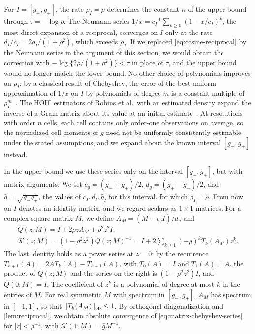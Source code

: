 For $I=[g_-,g_+]$, the rate $\rho_I=\rho$ determines the constant
$\kappa$ of the upper bound through $\tau=-\log\rho$. The Neumann series
$1/x=c_I^{-1}\sum_{k\ge0}(1-x/c_I)^k$, the most direct expansion of a
reciprocal, converges on $I$ only at the rate
$d_I/c_I=2\rho_I/(1+\rho_I^2)$, which exceeds $\rho_I$. If we replaced
\eqref{eq:cosine-reciprocal} by the Neumann series in the argument of
this section, we would obtain the correction with
$-\log\{2\rho/(1+\rho^2)\}<\tau$ in place of $\tau$, and the upper bound
would no longer match the lower bound. No other choice of polynomials
improves on $\rho_I$: by a classical result of
Chebyshev, the error of the best uniform approximation of $1/x$ on $I$ by
polynomials of degree $m$ is a constant multiple of
$\rho_I^m$~\cite[Theorem~2.1 and Corollary~2.2]{kraus2012}. The HOIF
estimators of Robins et al.\ with an estimated density expand
the inverse of a Gram matrix about its value at an initial
estimate~\cite[Theorems~3.14--3.15]{hoif2008}. At resolutions with order $n$
cells, each cell contains only order-one observations on average, so the
normalized cell moments of $g$ need not be uniformly consistently
estimable under the stated assumptions, and we expand about the known interval $[g_-,g_+]$
instead.

In the upper bound we use these series only on the interval $[g_-,g_+]$,
but with matrix arguments. We set $c_g=(g_-+g_+)/2$, $d_g=(g_+-g_-)/2$,
and $\bar g=\sqrt{g_-g_+}$, the values of $c_I,d_I,\bar g_I$ for this
interval, for which $\rho_I=\rho$. From now on $I$ denotes an identity
matrix, and we regard scalars as $1\times1$ matrices. For a complex square
matrix $M$, we define $A_M=(M-c_gI)/d_g$ and
\begin{equation}\label{eq:matrix-chebyshev-series}
 \begin{gathered}
 Q(z;M)=I+2\rho zA_M+\rho^2z^2I,\\
 \mathcal K(z;M)=(1-\rho^2z^2)Q(z;M)^{-1}
 =I+2\sum_{k\ge1}(-\rho)^kT_k(A_M)z^k.
 \end{gathered}
\end{equation}
The last identity holds as a power series at $z=0$: by the recurrence
$T_{k+1}(A)=2AT_k(A)-T_{k-1}(A)$, with
$T_0(A)=I$ and $T_1(A)=A$, the product of $Q(z;M)$ and the series on the
right is $(1-\rho^2z^2)I$, and $Q(0;M)=I$. The coefficient of $z^k$ is
a polynomial of degree at most $k$ in the entries of $M$. For real
symmetric $M$ with spectrum in $[g_-,g_+]$, $A_M$ has spectrum in
$[-1,1]$, so that $\|T_k(A_M)\|_{\rm op}\le1$. By orthogonal
diagonalization and \cref{lem:reciprocal}, we obtain absolute
convergence of \eqref{eq:matrix-chebyshev-series} for
$|z|<\rho^{-1}$, with $\mathcal K(1;M)=\bar gM^{-1}$.

